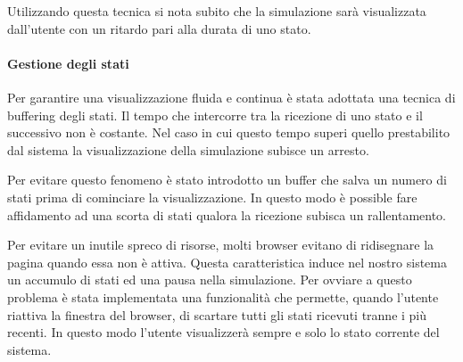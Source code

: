 Utilizzando questa tecnica si nota subito che la simulazione sarà visualizzata
dall'utente con un ritardo pari alla durata di uno stato.

\paragraph*{Gestione degli stati}
Per garantire una visualizzazione fluida e continua è stata adottata una tecnica
di buffering degli stati. Il tempo che intercorre tra la ricezione di uno stato
e il successivo non è costante. Nel caso in cui questo tempo superi quello
prestabilito dal sistema la visualizzazione della simulazione subisce un
arresto.

Per evitare questo fenomeno è stato introdotto un buffer che salva un numero di
stati prima di cominciare la visualizzazione. In questo modo è possible fare
affidamento ad una scorta di stati qualora la ricezione subisca un
rallentamento.

Per evitare un inutile spreco di risorse, molti browser evitano di ridisegnare
la pagina quando essa non è attiva. Questa caratteristica induce nel nostro
sistema un accumulo di stati ed una pausa nella simulazione. Per ovviare a
questo problema è stata implementata una funzionalità che permette, quando
l'utente riattiva la finestra del browser, di scartare tutti gli stati ricevuti
tranne i più recenti. In questo modo l'utente visualizzerà sempre e solo lo
stato corrente del sistema.
